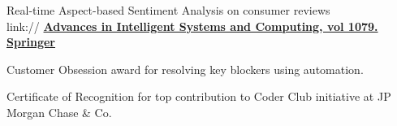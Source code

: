 \documentclass[]{deedy-resume-reversed}
\begin{document}
\begin{minipage}[t]{0.60\textwidth}
\begin{tightemize}
\vspace{\topsep} %
\item Real-time Aspect-based Sentiment Analysis on consumer reviews\\
link:// \href{https://link.springer.com/chapter/10.1007/978-981-15-1097-7_67}{\bf Advances in Intelligent Systems and Computing, vol 1079. Springer}
\item Customer Obsession award for resolving key blockers using automation.
\item Certificate of Recognition for top contribution to Coder Club initiative at JP Morgan Chase & Co.
\end{tightemize}
\sectionsep

%
%

\end{minipage}
\hfill
\end{document}

